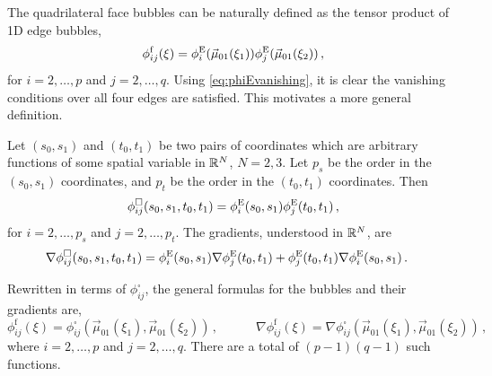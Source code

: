 The quadrilateral face bubbles can be naturally defined as the tensor product of 1D edge bubbles,
\begin{equation*}
    \phi_{ij}^\mathrm{f}(\xi)=\phi_i^{\mathrm{E}}(\vec{\mu}_{01}(\xi_1))\phi_j^{\mathrm{E}}(\vec{\mu}_{01}(\xi_2))\,,
\end{equation*}
for $i=2,\ldots,p$ and $j=2,\ldots,q$. 
Using \eqref{eq:phiEvanishing}, it is clear the vanishing conditions over all four edges are satisfied.
This motivates a more general definition.

\begin{definition*}
Let $(s_0,s_1)$ and $(t_0,t_1)$ be two pairs of coordinates which are arbitrary functions of some spatial variable in $\mathbb{R}^N$, $N=2,3$. Let $p_s$ be the order in the $(s_0,s_1)$ coordinates, and $p_t$ be the order in the $(t_0,t_1)$ coordinates. Then
\begin{equation}
    \phi_{ij}^\square(s_0,s_1,t_0,t_1)=\phi_i^{\mathrm{E}}(s_0,s_1)\phi_j^{\mathrm{E}}(t_0,t_1)\,,
\end{equation}
for $i=2,\ldots,p_s$ and $j=2,\ldots,p_t$. The gradients, understood in $\mathbb{R}^N$, are
\begin{equation}
	\begin{aligned}
    \nabla\phi_{ij}^\square(s_0,s_1,t_0,t_1)&=\phi_i^{\mathrm{E}}(s_0,s_1)\nabla\phi_j^{\mathrm{E}}(t_0,t_1)+\phi_j^{\mathrm{E}}(t_0,t_1)\nabla\phi_i^{\mathrm{E}}(s_0,s_1)\,.
	\end{aligned}
\end{equation}
\end{definition*}


Rewritten in terms of $\phi_{ij}^\square$, the general formulas for the bubbles and their gradients are,
\begin{equation}
    \phi_{ij}^\mathrm{f}(\xi)=\phi_{ij}^\square(\vec{\mu}_{01}(\xi_1),\vec{\mu}_{01}(\xi_2))\,,\qquad\quad
        \nabla\phi_{ij}^\mathrm{f}(\xi)=\nabla\phi_{ij}^\square(\vec{\mu}_{01}(\xi_1),\vec{\mu}_{01}(\xi_2))\,,
\end{equation}
where $i=2,\ldots,p$ and $j=2,\ldots,q$. 
There are a total of $(p-1)(q-1)$ such functions. 

